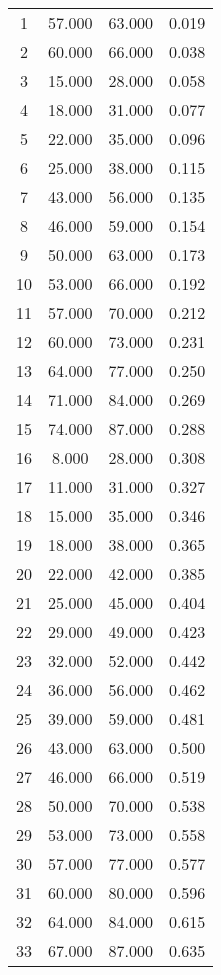 % 
\begin{tabular}{cccc}
  \hline
  \hline
1 & 57.000 & 63.000 & 0.019 \\ 
  2 & 60.000 & 66.000 & 0.038 \\ 
  3 & 15.000 & 28.000 & 0.058 \\ 
  4 & 18.000 & 31.000 & 0.077 \\ 
  5 & 22.000 & 35.000 & 0.096 \\ 
  6 & 25.000 & 38.000 & 0.115 \\ 
  7 & 43.000 & 56.000 & 0.135 \\ 
  8 & 46.000 & 59.000 & 0.154 \\ 
  9 & 50.000 & 63.000 & 0.173 \\ 
  10 & 53.000 & 66.000 & 0.192 \\ 
  11 & 57.000 & 70.000 & 0.212 \\ 
  12 & 60.000 & 73.000 & 0.231 \\ 
  13 & 64.000 & 77.000 & 0.250 \\ 
  14 & 71.000 & 84.000 & 0.269 \\ 
  15 & 74.000 & 87.000 & 0.288 \\ 
  16 & 8.000 & 28.000 & 0.308 \\ 
  17 & 11.000 & 31.000 & 0.327 \\ 
  18 & 15.000 & 35.000 & 0.346 \\ 
  19 & 18.000 & 38.000 & 0.365 \\ 
  20 & 22.000 & 42.000 & 0.385 \\ 
  21 & 25.000 & 45.000 & 0.404 \\ 
  22 & 29.000 & 49.000 & 0.423 \\ 
  23 & 32.000 & 52.000 & 0.442 \\ 
  24 & 36.000 & 56.000 & 0.462 \\ 
  25 & 39.000 & 59.000 & 0.481 \\ 
  26 & 43.000 & 63.000 & 0.500 \\ 
  27 & 46.000 & 66.000 & 0.519 \\ 
  28 & 50.000 & 70.000 & 0.538 \\ 
  29 & 53.000 & 73.000 & 0.558 \\ 
  30 & 57.000 & 77.000 & 0.577 \\ 
  31 & 60.000 & 80.000 & 0.596 \\ 
  32 & 64.000 & 84.000 & 0.615 \\ 
  33 & 67.000 & 87.000 & 0.635 \\ 

\end{tabular}
